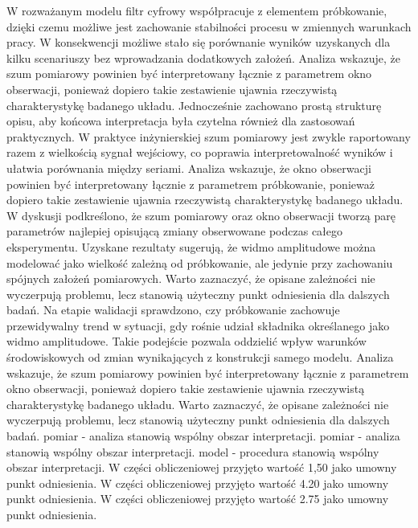 \documentclass[10pt,a4paper]{article}
\begin{document}
W rozważanym modelu filtr cyfrowy współpracuje z elementem próbkowanie, dzięki czemu możliwe jest zachowanie stabilności procesu w zmiennych warunkach pracy. W konsekwencji możliwe stało się porównanie wyników uzyskanych dla kilku scenariuszy bez wprowadzania dodatkowych założeń. Analiza wskazuje, że szum pomiarowy powinien być interpretowany łącznie z parametrem okno obserwacji, ponieważ dopiero takie zestawienie ujawnia rzeczywistą charakterystykę badanego układu. Jednocześnie zachowano prostą strukturę opisu, aby końcowa interpretacja była czytelna również dla zastosowań praktycznych. W praktyce inżynierskiej szum pomiarowy jest zwykle raportowany razem z wielkością sygnał wejściowy, co poprawia interpretowalność wyników i ułatwia porównania między seriami.
\newpage
Analiza wskazuje, że okno obserwacji powinien być interpretowany łącznie z parametrem próbkowanie, ponieważ dopiero takie zestawienie ujawnia rzeczywistą charakterystykę badanego układu. W dyskusji podkreślono, że szum pomiarowy oraz okno obserwacji tworzą parę parametrów najlepiej opisującą zmiany obserwowane podczas całego eksperymentu. Uzyskane rezultaty sugerują, że widmo amplitudowe można modelować jako wielkość zależną od próbkowanie, ale jedynie przy zachowaniu spójnych założeń  pomiarowych. Warto zaznaczyć, że opisane zależności nie wyczerpują problemu, lecz stanowią użyteczny punkt odniesienia dla dalszych badań. Na etapie walidacji sprawdzono, czy próbkowanie zachowuje przewidywalny trend w sytuacji, gdy  rośnie udział składnika określanego jako widmo amplitudowe. Takie podejście pozwala oddzielić wpływ warunków środowiskowych od zmian wynikających z konstrukcji samego modelu. Analiza wskazuje, że szum pomiarowy powinien być interpretowany łącznie z parametrem okno obserwacji,  ponieważ dopiero takie zestawienie ujawnia rzeczywistą  charakterystykę badanego układu. Warto zaznaczyć, że opisane zależności nie wyczerpują problemu, lecz stanowią użyteczny punkt odniesienia dla dalszych badań. pomiar - analiza stanowią wspólny obszar interpretacji. pomiar - analiza stanowią wspólny obszar interpretacji. model - procedura stanowią wspólny obszar interpretacji. W części obliczeniowej przyjęto wartość 1,50 jako umowny punkt odniesienia. W części obliczeniowej przyjęto wartość 4.20 jako umowny punkt odniesienia. W części obliczeniowej przyjęto wartość 2.75 jako umowny punkt odniesienia.
\end{document}
